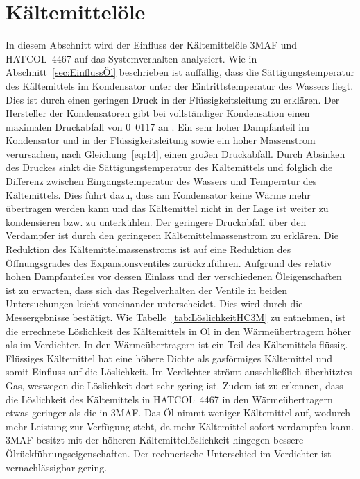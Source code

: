 \section{Kältemittelöle}
\label{sec:Kältemittelöleanalyse}

In diesem Abschnitt wird der Einfluss der Kältemittelöle 3MAF und HATCOL~4467 auf das Systemverhalten analysiert.
Wie in Abschnitt~\ref{sec:EinflussÖl} beschrieben ist auffällig, dass die Sättigungstemperatur des Kältemittels im Kondensator unter der Eintrittstemperatur des Wassers liegt. Dies ist durch einen geringen Druck in der Flüssigkeitsleitung zu erklären. Der Hersteller der Kondensatoren gibt bei vollständiger Kondensation einen maximalen Druckabfall von \unit{0.0117}{\bbar} an \cite{SWEP.2017}. Ein sehr hoher Dampfanteil im Kondensator und in der Flüssigkeitsleitung sowie ein hoher Massenstrom verursachen, nach Gleichung~\ref{eq:14}, einen großen Druckabfall. Durch Absinken des Druckes sinkt die Sättigungstemperatur des Kältemittels und folglich die Differenz zwischen Eingangstemperatur des Wassers und Temperatur des Kältemittels. Dies führt dazu, dass am Kondensator keine Wärme mehr übertragen werden kann und das Kältemittel nicht in der Lage ist weiter zu kondensieren bzw. zu unterkühlen. Der geringere Druckabfall über den Verdampfer ist durch den geringeren Kältemittelmassenstrom zu erklären. Die Reduktion des Kältemittelmassenstroms ist auf eine Reduktion des Öffnungsgrades des Expansionsventiles zurückzuführen. Aufgrund des relativ hohen Dampfanteiles vor dessen Einlass und der verschiedenen Öleigenschaften ist zu erwarten, dass sich das Regelverhalten der Ventile in beiden Untersuchungen leicht voneinander unterscheidet. Dies wird durch die Messergebnisse bestätigt. \newline
Wie Tabelle~\ref{tab:LöslichkeitHC3M} zu entnehmen, ist die errechnete Löslichkeit des Kältemittels in Öl in den Wärmeübertragern höher als im Verdichter. In den Wärmeübertragern ist ein Teil des Kältemittels flüssig. Flüssiges Kältemittel hat eine höhere Dichte als gasförmiges Kältemittel und somit Einfluss auf die Löslichkeit. Im Verdichter strömt ausschließlich überhitztes Gas, weswegen die Löslichkeit dort sehr gering ist. \newline
Zudem ist zu erkennen, dass die Löslichkeit des Kältemittels in HATCOL~4467 in den Wärmeübertragern etwas geringer als die in 3MAF. Das Öl nimmt weniger Kältemittel auf, wodurch mehr Leistung zur Verfügung steht, da mehr Kältemittel sofort verdampfen kann. 3MAF besitzt mit der höheren Kältemittellöslichkeit hingegen bessere Ölrückführungseigenschaften. Der rechnerische Unterschied im Verdichter ist vernachlässigbar gering.
